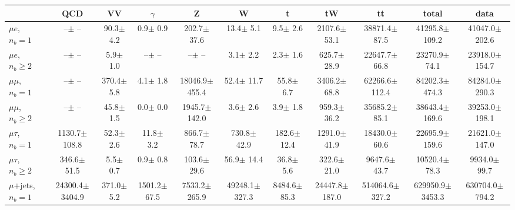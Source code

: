 \begin{sidewaystable}[ht]
    \centering
    \setlength{\tabcolsep}{0.0em}
    \renewcommand{\arraystretch}{2}
    \footnotesize
    \begin{tabular}{l|cccccccc|cc}
    \hline
        & QCD & VV  & $\gamma$ & Z & W & t & tW & tt & total & data      \\
    \hline
    
    $\mu e$, $n_b=1$                   &       --$\pm$     -- &     90.3$\pm$    4.2 &      0.9$\pm$    0.9 &    202.7$\pm$   37.6 &     13.4$\pm$    5.1 &      9.5$\pm$    2.6 &   2107.6$\pm$   53.1 &  38871.4$\pm$   87.5 &  41295.8$\pm$  109.2 &  41047.0$\pm$  202.6 \\ 
    $\mu e$, $n_b\geq2$                &       --$\pm$     -- &      5.9$\pm$    1.0 &       --$\pm$     -- &       --$\pm$     -- &      3.1$\pm$    2.2 &      2.3$\pm$    1.6 &    625.7$\pm$   28.9 &  22647.7$\pm$   66.8 &  23270.9$\pm$   74.1 &  23918.0$\pm$  154.7 \\ 
    \hline
    $\mu\mu$, $n_b=1$                  &       --$\pm$     -- &    370.4$\pm$    5.8 &      4.1$\pm$    1.8 &  18046.9$\pm$  455.4 &     52.4$\pm$   11.7 &     55.8$\pm$    6.7 &   3406.2$\pm$   68.8 &  62266.6$\pm$  112.4 &  84202.3$\pm$  474.3 &  84284.0$\pm$  290.3 \\ 
    $\mu\mu$, $n_b\geq2$               &       --$\pm$     -- &     45.8$\pm$    1.5 &      0.0$\pm$    0.0 &   1945.7$\pm$  142.0 &      3.6$\pm$    2.6 &      3.9$\pm$    1.8 &    959.3$\pm$   36.2 &  35685.2$\pm$   85.1 &  38643.4$\pm$  169.6 &  39253.0$\pm$  198.1 \\ 
    \hline
    $\mu\tau$, $n_b=1$                 &   1130.7$\pm$  108.8 &     52.3$\pm$    2.6 &     11.8$\pm$    3.2 &    866.7$\pm$   78.7 &    730.8$\pm$   42.9 &    182.6$\pm$   12.4 &   1291.0$\pm$   41.9 &  18430.0$\pm$   60.6 &  22695.9$\pm$  159.6 &  21621.0$\pm$  147.0 \\ 
    $\mu\tau$, $n_b\geq2$              &    346.6$\pm$   51.5 &      5.5$\pm$    0.7 &      0.9$\pm$    0.8 &    103.6$\pm$   29.6 &     56.9$\pm$   14.4 &     36.8$\pm$    5.6 &    322.6$\pm$   21.0 &   9647.6$\pm$   43.7 &  10520.4$\pm$   78.3 &   9934.0$\pm$   99.7 \\ 
    \hline
    $\mu$+jets, $n_b=1$                &  24300.4$\pm$ 3404.9 &    371.0$\pm$    5.2 &   1501.2$\pm$   67.5 &   7533.2$\pm$  265.9 &  49248.1$\pm$  327.3 &   8484.6$\pm$   85.3 &  24447.8$\pm$  187.0 & 514064.6$\pm$  327.2 & 629950.9$\pm$ 3453.3 & 630704.0$\pm$  794.2 \\ 

\end{tabular}
\end{sidewaystable}
